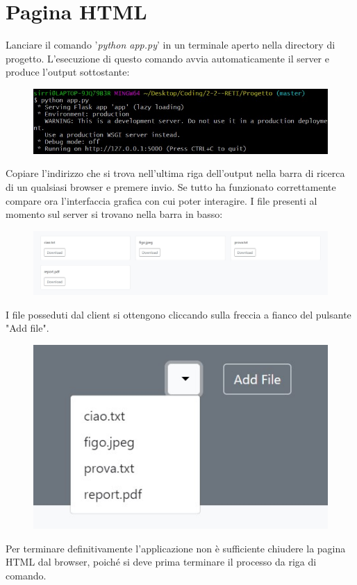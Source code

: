 \documentclass[a4paper,12pt]{report}
\begin{document}
\section{Pagina HTML}
Lanciare il comando '\textit{python app.py}' in un terminale aperto nella directory di progetto. L'esecuzione di questo comando avvia automaticamente il server e produce l'output sottostante:
\begin{figure}[H]
    \centering
    \includegraphics[width=\textwidth]{img/gui.jpg}
\end{figure}

Copiare l'indirizzo che si trova nell'ultima riga dell'output nella barra di ricerca di un qualsiasi browser e premere invio. Se tutto ha funzionato correttamente compare ora l'interfaccia grafica con cui poter interagire. I file presenti al momento sul server si trovano nella barra in basso:
\begin{figure}[H]
    \centering
    \includegraphics[width=\textwidth]{img/gui_1.jpg}
\end{figure}

I file posseduti dal client si ottengono cliccando sulla freccia a fianco del pulsante "Add file".
\begin{figure}[H]
    \centering
    \includegraphics[scale=0.8]{img/gui_2.jpg}
\end{figure}

Per terminare definitivamente l'applicazione non è sufficiente chiudere la pagina HTML dal browser, poiché si deve prima terminare il processo da riga di comando.
\end{document}
